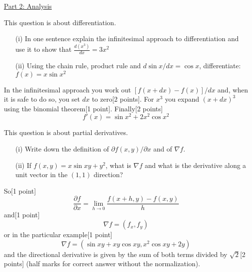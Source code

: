 \documentclass{uob-cs-exam}
\begin{document}


\begin{center}
    \underline{Part 2: Analysis}
\end{center}


\vspace*{2ex}
\begin{questions}

\question[5]
This question is about differentiation. 
\begin{itemize}
\item[(i)] In one sentence explain the infinitesimal approach to differentiation and use it to
show that $\frac{d(x^3)}{dx}=3x^2$
\item[(ii)] Using the chain rule, product rule and $d\sin{x}/dx=\cos{x}$, differentiate: $f(x)=x\sin{x^2}$
  \end{itemize}
  
\droppoints
\begin{solution}
In the infinitesimal approach you work out $[f(x+dx)-f(x)]/dx$ and, when it is safe to do so, you set $dx$ to zero[2 points]. For $x^3$ you expand $(x+dx)^3$ using the binomial theorem[1 point]. Finally[2 points]
  $$
  f'(x)=\sin{x^2}+2x^2\cos{x^2}
  $$
\end{solution}

\question[5]
This question is about partial derivatives. 
\begin{itemize}
\item[(i)] Write down the definition of $\partial f(x,y)/\partial x$ and of $\nabla f$. 
\item[(ii)] If $f(x,y)=x\sin{xy}+y^2$, what is $\nabla f$ and what is the derivative along a unit vector in the $(1,1)$ direction?
\end{itemize}

\droppoints
\begin{solution}
    So[1 point]
    $$
    \frac{\partial f}{\partial x}=\lim_{h\rightarrow 0}\frac{f(x+h,y)-f(x,y)}{h}
    $$
    and[1 point]
    $$
    \nabla f= (f_x,f_y)
    $$
    or in the particular example[1 point]
$$
      \nabla f=(\sin{xy}+xy\cos{xy},x^2\cos{xy}+2y)
      $$
      and the directional derivative is given by the sum of both terms divided by $\sqrt{2}$[2 points] (half marks for correct answer without the normalization).
\end{solution}
    

\end{questions}
\end{document}
